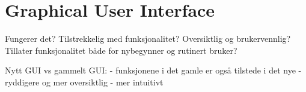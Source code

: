 \section{Graphical User Interface}
Fungerer det? Tilstrekkelig med funksjonalitet? Oversiktlig og brukervennlig? Tillater funksjonalitet både for nybegynner og rutinert bruker?


Nytt GUI vs gammelt GUI:
- funksjonene i det gamle er også tilstede i det nye
- ryddigere og mer oversiktlig
- mer intuitivt

